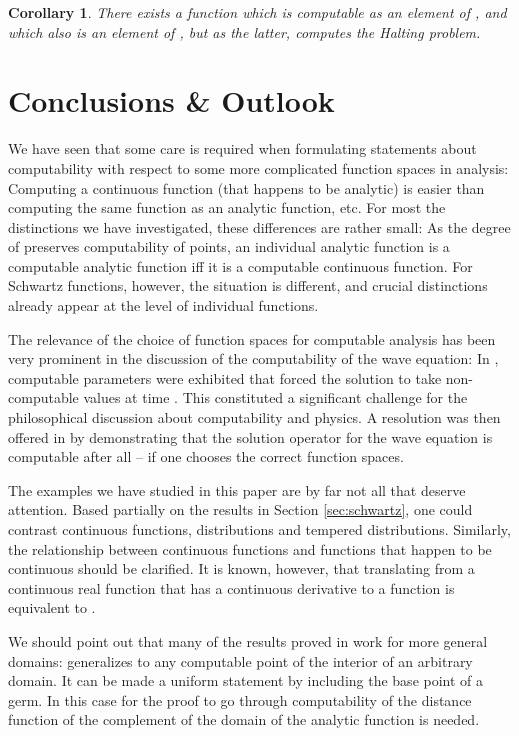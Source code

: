 \documentclass{eptcs-modified}
\newtheorem{corollary}[theorem]{Corollary}
\begin{document}
			\begin{corollary}
				There exists a function  which is computable as an element of , and which also is an element of , but as the latter, computes the Halting problem.
			\end{corollary}

	\section{Conclusions \& Outlook}
		We have seen that some care is required when formulating statements about computability with respect to some more complicated function spaces in analysis:
		Computing a continuous function (that happens to be analytic) is easier than computing the same function as an analytic function, etc.
		For most the distinctions we have investigated, these differences are rather small:
		As the degree of  preserves computability of points, an individual analytic function is a computable analytic function iff it is a computable continuous function.
		For Schwartz functions, however, the situation is different, and crucial distinctions already appear at the level of individual functions.

		The relevance of the choice of function spaces for computable analysis has been very prominent in the discussion of the computability of the wave equation:
		In \cite{pourel2,pourel3}, computable parameters were exhibited that forced the solution to take non-computable values at time .
		This constituted a significant challenge for the philosophical discussion about computability and physics.
		A resolution was then offered in \cite{zhong2} by demonstrating that the solution operator for the wave equation is computable after all -- if one chooses the correct function spaces.

		The examples we have studied in this paper are by far not all that deserve attention.
		Based partially on the results in Section \ref{sec:schwartz}, one could contrast continuous functions, distributions and tempered distributions.
		Similarly, the relationship between continuous functions and  functions that happen to be continuous should be clarified.
		It is known, however, that translating from a continuous real function that has a continuous derivative to a  function is equivalent to  \cite{stein}.

		We should point out that many of the results proved in  work for more general domains:
		 generalizes to any computable point of the interior of an arbitrary domain.
		It can be made a uniform statement by including the base point of a germ.
		In this case for the proof to go through computability of the distance function of the complement of the domain of the analytic function is needed.
\end{document}
